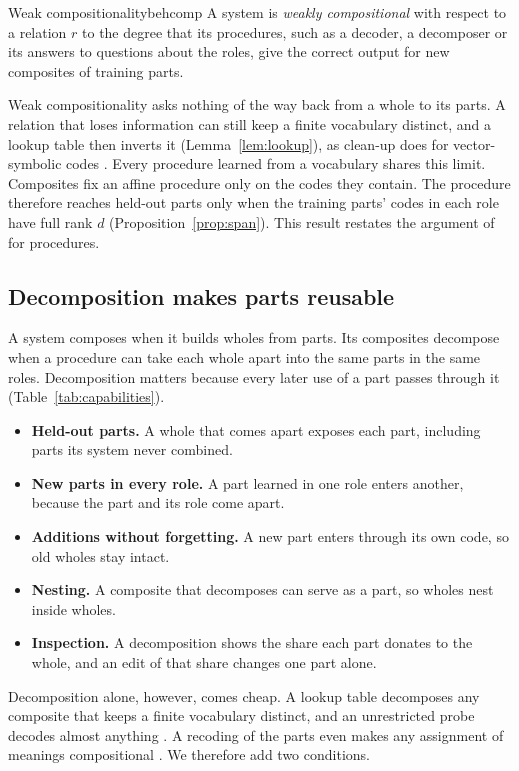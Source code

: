 \begin{defbox}{Weak compositionality}{behcomp}
A system is \emph{weakly compositional} with respect to a relation $r$ to the degree that its procedures, such as a decoder, a decomposer or its answers to questions about the roles, give the correct output for new composites of training parts.
\end{defbox}

Weak compositionality asks nothing of the way back from a whole to its parts. A relation that loses information can still keep a finite vocabulary distinct, and a lookup table then inverts it (Lemma~\ref{lem:lookup}), as clean-up does for vector-symbolic codes \citep{plate1995}. Every procedure learned from a vocabulary shares this limit. Composites fix an affine procedure only on the codes they contain. The procedure therefore reaches held-out parts only when the training parts' codes in each role have full rank $d$ (Proposition~\ref{prop:span}). This result restates the argument of \citet{marcus1998} for procedures.

\subsection{Decomposition makes parts reusable}
\label{sec:decomposition}

A system composes when it builds wholes from parts. Its composites decompose when a procedure can take each whole apart into the same parts in the same roles. Decomposition matters because every later use of a part passes through it (Table~\ref{tab:capabilities}).
\begin{itemize}
  \item \textbf{Held-out parts.} A whole that comes apart exposes each part, including parts its system never combined.
  \item \textbf{New parts in every role.} A part learned in one role enters another, because the part and its role come apart.
  \item \textbf{Additions without forgetting.} A new part enters through its own code, so old wholes stay intact.
  \item \textbf{Nesting.} A composite that decomposes can serve as a part, so wholes nest inside wholes.
  \item \textbf{Inspection.} A decomposition shows the share each part donates to the whole, and an edit of that share changes one part alone.
\end{itemize}

Decomposition alone, however, comes cheap. A lookup table decomposes any composite that keeps a finite vocabulary distinct, and an unrestricted probe decodes almost anything \citep{hewitt2019}. A recoding of the parts even makes any assignment of meanings compositional \citep{zadrozny1994}. We therefore add two conditions.

